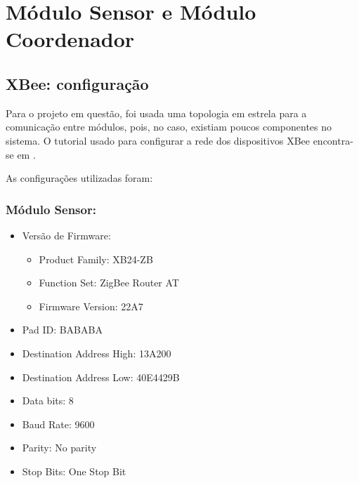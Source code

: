 \section{Módulo Sensor e Módulo Coordenador}
\label{Sec:5-hardware}

\subsection{XBee: configuração}
Para o projeto em questão, foi usada uma topologia em estrela para a comunicação entre módulos, pois, no caso, existiam poucos componentes no sistema.
O tutorial usado para configurar a rede dos dispositivos XBee encontra-se em \cite{xbee_setup}.

As configurações utilizadas foram: 

\subsubsection{Módulo Sensor:}
\begin{itemize}
	\item Versão de Firmware:
    \begin{itemize}
    	\item Product Family: XB24-ZB
        \item Function Set: ZigBee Router AT
        \item Firmware Version: 22A7
    \end{itemize}
    \item Pad ID: BABABA
        \item Destination Address High: 13A200
        \item Destination Address Low: 40E4429B
        \item Data bits: 8
        \item Baud Rate: 9600
        \item Parity: No parity
        \item Stop Bits: One Stop Bit
\end{itemize}

